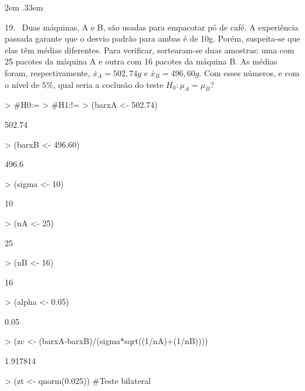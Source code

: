 \documentclass{article}
\newenvironment{ManualExercise}
  {\begin{list}{}{\leftmargin \QuestionIndent
    \partopsep0pt \parsep\parskip \topsep\QuestionBefore
    \itemsep\QuestionBefore \labelwidth2em
    \labelsep.33em
    \usecounter{Question}}}
  {\end{list}}
\begin{document}
\begin{Exercise}
\begin{ManualExercise}
\item[19.~]Duas máquinas, A e B, são usadas para empacotar pó de café. A experiência passada garante que o desvio padrão para ambas é de 10g. Porém, suspeita-se que elas têm médias diferentes. Para verificar, sortearam-se duas amostras: uma com 25 pacotes da máquina A e outra com 16 pacotes da máquina B. As médias foram, respectivamente, $\bar{x}_{A} = 502,74g$ e $\bar{x}_{B} = 496,60 g$.  Com esses números, e com o nível de $5\%$, qual seria a coclusão do teste $H_0:\mu_A =\mu_B$?

\begin{Schunk}
\begin{Sinput}
> #H0:\muA=\muB
> #H1:\muA!=\muB
> (barxA <- 502.74)
\end{Sinput}
\begin{Soutput}
[1] 502.74
\end{Soutput}
\begin{Sinput}
> (barxB <- 496.60)
\end{Sinput}
\begin{Soutput}
[1] 496.6
\end{Soutput}
\begin{Sinput}
> (sigma <- 10)
\end{Sinput}
\begin{Soutput}
[1] 10
\end{Soutput}
\begin{Sinput}
> (nA <- 25)
\end{Sinput}
\begin{Soutput}
[1] 25
\end{Soutput}
\begin{Sinput}
> (nB <- 16)
\end{Sinput}
\begin{Soutput}
[1] 16
\end{Soutput}
\begin{Sinput}
> (alpha <- 0.05)
\end{Sinput}
\begin{Soutput}
[1] 0.05
\end{Soutput}
\begin{Sinput}
> (zc <- (barxA-barxB)/(sigma*sqrt((1/nA)+(1/nB))))
\end{Sinput}
\begin{Soutput}
[1] 1.917814
\end{Soutput}
\begin{Sinput}
> (zt <- qnorm(0.025)) #Teste bilateral
\end{Sinput}
\begin{Soutput}

\end{Soutput}
\end{Schunk}
\end{ManualExercise}
\end{Exercise}
\end{document}
